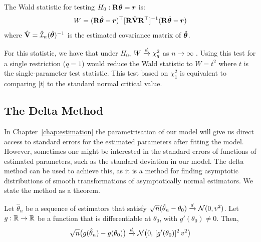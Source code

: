 \begin{definition}
The Wald statistic for testing $H_0: \mathbf{R}\bm{\theta} = \bm{r}$ is:
\begin{equation}
    W = (\mathbf{R}\hat{\bm{\theta}} - \bm{r})^\top [\mathbf{R}\hat{\mathbf{V}}\mathbf{R}^\top]^{-1} (\mathbf{R}\hat{\bm{\theta}} - \bm{r})
\end{equation}
where $\hat{\mathbf{V}} = \hat{\mathcal{I}}_n(\hat{\bm{\theta}})^{-1}$ is the estimated covariance matrix of $\hat{\bm{\theta}}$.
\end{definition}

For this statistic, we have that under $H_0$, $W \xrightarrow{d} \chi^2_q$ as $n \to \infty$ \parencite[Sec.~16.2, p.~231]{vanderVaart1998}. Using this test for a single restriction ($q = 1$) would reduce the Wald statistic to $W = t^2$ where $t$ is the single-parameter test statistic. This test based on $\chi^2_1$ is equivalent to comparing $|t|$ to the standard normal critical value.

\subsection{The Delta Method}
\label{sec:bg:delta_method}
In Chapter~\ref{chap:estimation} the parametrisation of our model will give us direct access to standard errors for the estimated parameters after fitting the model. However, sometimes one might be interested in the standard errors of functions of estimated parameters, such as the standard deviation in our model. The delta method can be used to achieve this, as it is a method for finding asymptotic distributions of smooth transformations of asymptotically normal estimators. We state the method as a theorem.

\begin{theorem}
\label{thm:delta_method}
Let $\hat\theta_n$ be a sequence of estimators that satisfy $\sqrt{n}(\hat\theta_n - \theta_0) \xrightarrow{d} \mathcal{N}(0, v^2)$. Let $g: \mathbb{R} \to \mathbb{R}$ be a function that is differentiable at $\theta_0$, with $g'(\theta_0) \neq 0$. Then,
\begin{equation}
\label{eq:delta_method}
    \sqrt{n}\bigl(g(\hat\theta_n) - g(\theta_0)\bigr) \xrightarrow{d} \mathcal{N}\bigl(0,\, [g'(\theta_0)]^2 \, v^2\bigr)
\end{equation}
\end{theorem}

